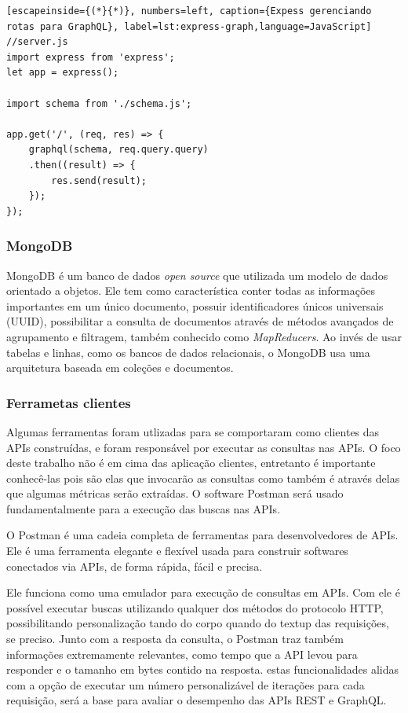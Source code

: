 \begin{lstlisting}[escapeinside={(*}{*)}, numbers=left, caption={Expess gerenciando rotas para GraphQL}, label=lst:express-graph,language=JavaScript]
//server.js
import express from 'express';
let app = express();

import schema from './schema.js';

app.get('/', (req, res) => {
    graphql(schema, req.query.query)
    .then((result) => {
        res.send(result);
    });
});

\end{lstlisting}

\subsubsection*{MongoDB}

MongoDB é um banco de dados \textit{open source} que utilizada um modelo de dados orientado a objetos. Ele tem como característica conter todas as informações importantes em um único documento, possuir identificadores únicos universais (UUID), possibilitar a consulta de documentos através de métodos avançados de agrupamento e filtragem, também conhecido como \textit{MapReducers}. Ao invés de usar tabelas e linhas, como os bancos de dados relacionais, o MongoDB usa uma arquitetura baseada em coleções e documentos.


\subsubsection*{Ferrametas clientes}

Algumas ferramentas foram utlizadas para se comportaram como clientes das APIs construídas, e foram responsável por executar as consultas nas APIs. O foco deste trabalho não é em cima das aplicação clientes, entretanto é importante conhecê-las pois são elas que invocarão as consultas como também é através delas que algumas métricas serão extraídas. O software Postman será usado fundamentalmente para a execução das buscas nas APIs.

O Postman é uma cadeia completa de ferramentas para desenvolvedores de APIs. Ele é uma ferramenta elegante e flexível usada para construir softwares conectados via APIs, de forma rápida, fácil e precisa.

Ele funciona como uma emulador para execução de consultas em APIs. Com ele é possível executar buscas utilizando qualquer dos métodos do protocolo HTTP, possibilitando personalização tando do corpo quando do textup das requisições, se preciso. Junto com a resposta da consulta, o Postman traz também informações extremamente relevantes, como tempo que a API levou para responder e o tamanho em bytes contido na resposta. estas funcionalidades alidas com a opção de executar um número personalizável de iterações para cada requisição, será a base para avaliar o desempenho das APIs REST e GraphQL.

